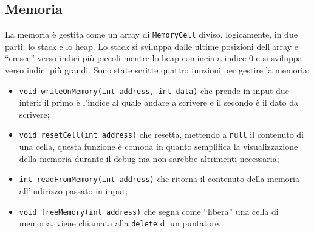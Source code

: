 \documentclass[../report.tex]{subfiles}
\begin{document}
\subsection{Memoria}\label{ss:memoria}
La memoria \`e gestita come un array di \verb|MemoryCell| diviso, logicamente, in due parti: lo stack e lo heap. Lo stack si sviluppa dalle ultime posizioni dell'array e ``cresce'' verso indici pi\`u piccoli mentre lo heap comincia a indice 0 e si sviluppa verso indici pi\`u grandi. Sono state scritte quattro funzioni per gestire la memoria:
\begin{itemize}
    \item \verb|void writeOnMemory(int address, int data)| che prende in input due interi: il primo \`e l'indice al quale andare a scrivere e il secondo \`e il dato da scrivere;
    \item \verb|void resetCell(int address)| che resetta, mettendo a \verb|null| il contenuto di una cella, questa funzione \`e comoda in quanto semplifica la visualizzazione della memoria durante il debug ma non sarebbe altrimenti necessaria;
    \item \verb|int readFromMemory(int address)| che ritorna il contenuto della memoria all'indirizzo passato in input;
    \item \verb|void freeMemory(int address)| che segna come ``libera'' una cella di memoria, viene chiamata alla \verb|delete| di un puntatore.
\end{itemize}
\end{document}
